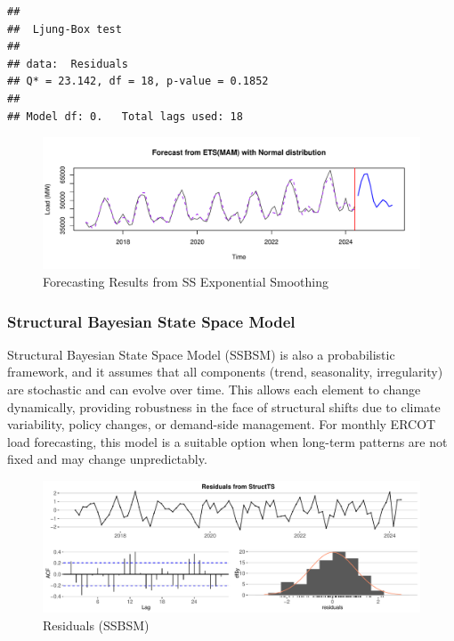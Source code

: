 \documentclass[
]{article}
\begin{document}
\begin{verbatim}
## 
##  Ljung-Box test
## 
## data:  Residuals
## Q* = 23.142, df = 18, p-value = 0.1852
## 
## Model df: 0.   Total lags used: 18
\end{verbatim}

\begin{figure}
\centering
\includegraphics{FinalProject_Report_files/figure-latex/unnamed-chunk-20-1.pdf}
\caption{Forecasting Results from SS Exponential Smoothing}
\end{figure}

\newpage

\subsubsection{Structural Bayesian State Space
Model}\label{structural-bayesian-state-space-model}

Structural Bayesian State Space Model (SSBSM) is also a probabilistic
framework, and it assumes that all components (trend, seasonality,
irregularity) are stochastic and can evolve over time. This allows each
element to change dynamically, providing robustness in the face of
structural shifts due to climate variability, policy changes, or
demand-side management. For monthly ERCOT load forecasting, this model
is a suitable option when long-term patterns are not fixed and may
change unpredictably.

\begin{figure}
\centering
\includegraphics{FinalProject_Report_files/figure-latex/unnamed-chunk-21-1.pdf}
\caption{Residuals (SSBSM)}
\end{figure}
\end{document}
